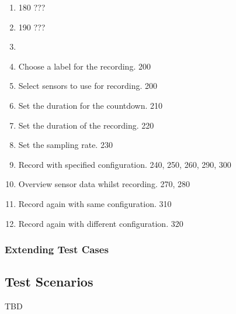\begin{enumerate}[{label = \textbf{/T{\protect\twodigits{\arabic{enumi}}}0/}, leftmargin = *}]
    \item 180 ???
    \item 190 ???
    \item 
    \item Choose a label for the recording. 200
    \item Select sensors to use for recording. 200
    \item Set the duration for the countdown. 210
    \item Set the duration of the recording. 220
    \item Set the sampling rate. 230
    \item Record with specified configuration. 240, 250, 260, 290, 300
    \item Overview sensor data whilst recording. 270, 280
    \item Record again with same configuration. 310
    \item Record again with different configuration. 320
\end{enumerate}
\subsubsection{Extending Test Cases}
\subsection{Test Scenarios}
TBD